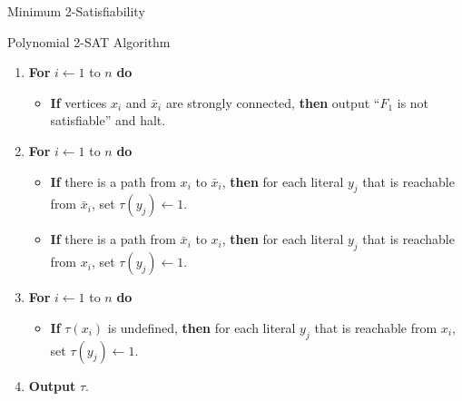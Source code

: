 \documentclass[xcolor=svgnames]{beamer}
\begin{document}
\begin{section}{Minimum 2-Satisfiability}
\begin{frame}{Polynomial 2-SAT Algorithm}
\begin{enumerate}
{            }
            \item<3-> \textbf{For} $i \gets 1$ to $n$ \textbf{do}
            \begin{itemize}
                \item[] \textbf{If} vertices $x_i$ and $\bar{x}_i$ are strongly connected, \textbf{then} output ``$F_1$ is not satisfiable'' and halt.
            \end{itemize}
            
            \item<4-> \textbf{For} $i \gets 1$ to $n$ \textbf{do}
            \begin{itemize}
                \item \textbf{If} there is a path from $x_i$ to $\bar{x}_i$, \textbf{then} for each literal $y_j$ that is reachable from $\bar{x}_i$, set $\tau(y_j) \gets 1$.
                \item \textbf{If} there is a path from $\bar{x}_i$ to $x_i$, \textbf{then} for each literal $y_j$ that is reachable from $x_i$, set $\tau(y_j) \gets 1$.
            \end{itemize}
            
            \item<5-> \textbf{For} $i \gets 1$ to $n$ \textbf{do}
            \begin{itemize}
                \item \textbf{If} $\tau(x_i)$ is undefined, \textbf{then} for each literal $y_j$ that is reachable from $x_i$, set $\tau(y_j) \gets 1$.
            \end{itemize}
            
            \item<6-> \textbf{Output} $\tau$.
        \end{enumerate}
    
    \end{frame}


\end{section}
\end{document}
